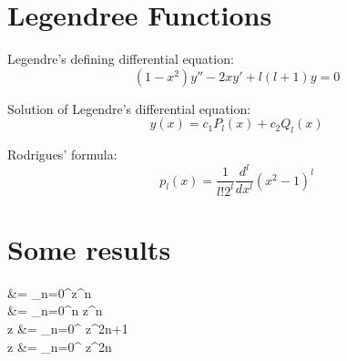 \documentclass[12pt,twoside]{article}
\begin{document}
\section{Legendree Functions}

Legendre's defining differential equation:
\[
	(1-x^2) y'' - 2 x y' + l (l+1) y = 0
\]

Solution of Legendre's differential equation:
\[
	y(x) = c_1 P_l(x) + c_2 Q_l(x)
\]

Rodrigues' formula:
\[
	p_l(x) = \frac{1}{l!2^l} \frac{d^l}{dx^l} (x^2-1)^l
\]

\section{Some results}

\ba
	 &= \sum_{n=0}^\infty z^n \\
	 &= \sum_{n=0}^\infty n z^n \\
	\sin z &=  \sum_{n=0}^\infty  {} z^{2n+1} \\
	\cos z &=  \sum_{n=0}^\infty  {} z^{2n} \\
\ea
\end{document}
